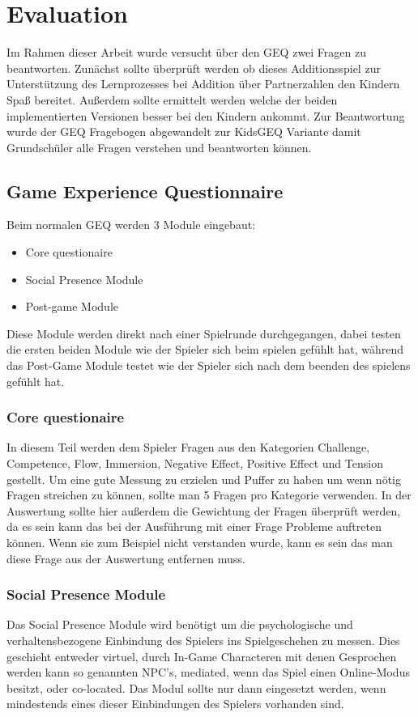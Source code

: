 \chapter{Evaluation} %
Im Rahmen dieser Arbeit wurde versucht über den GEQ zwei Fragen zu beantworten. Zunächst sollte überprüft werden ob dieses Additionsspiel zur Unterstützung des Lernprozesses bei Addition über Partnerzahlen den Kindern Spaß bereitet. Außerdem sollte ermittelt werden welche der beiden implementierten Versionen besser bei den Kindern ankommt. Zur Beantwortung wurde der GEQ Fragebogen abgewandelt zur KidsGEQ Variante damit Grundschüler alle Fragen verstehen und beantworten können.
\section{Game Experience Questionnaire}
Beim normalen GEQ werden 3 Module eingebaut:
\begin{itemize}
\item Core questionaire
\item Social Presence Module
\item Post-game Module
\end{itemize}
Diese Module werden direkt nach einer Spielrunde durchgegangen, dabei testen die ersten beiden Module wie der Spieler sich beim spielen gefühlt hat, während das Post-Game Module testet wie der Spieler sich nach dem beenden des spielens gefühlt hat.
\subsection{Core questionaire}
In diesem Teil werden dem Spieler Fragen aus den Kategorien Challenge, Competence, Flow, Immersion, Negative Effect, Positive Effect und Tension gestellt. Um eine gute Messung zu erzielen und Puffer zu haben um wenn nötig Fragen streichen zu können, sollte man 5 Fragen pro Kategorie verwenden. In der Auswertung sollte hier außerdem die Gewichtung der Fragen überprüft werden, da es sein kann das bei der Ausführung mit einer Frage Probleme auftreten können. Wenn sie zum Beispiel nicht verstanden wurde, kann es sein das man diese Frage aus der Auswertung entfernen muss.
\subsection{Social Presence Module} %
Das Social Presence Module wird benötigt um die psychologische und verhaltensbezogene Einbindung des Spielers ins Spielgeschehen zu messen. Dies geschieht entweder virtuel, durch In-Game Characteren mit denen Gesprochen werden kann so genannten NPC's, mediated, wenn das Spiel einen Online-Modus besitzt, oder co-located. Das Modul sollte nur dann eingesetzt werden, wenn mindestends eines dieser Einbindungen des Spielers vorhanden sind.
